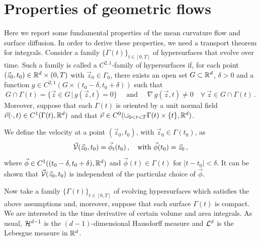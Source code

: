 \section{Properties of geometric flows}\label{sec:geometric_flows_properties}
Here we report some fundamental properties of the mean curvature flow and
surface diffusion. In order to derive these properties, we need a transport
theorem for integrals. Consider a family $\{ \Gamma(t) \}_{t \in [0, T]}$
of hypersurfaces that evolve over time. Such a family is called a
$C^{2,1}$-family of hypersurfaces if, for each point $(\vec z_0, t_0) \in
{\mathbb R}^{d} \times (0, T)$ with $\vec z_0 \in \Gamma_0$, there exists an
open set $G \subset {\mathbb R}^{d}$, $\delta > 0$ and a function
$g \in C^{2,1}(G \times (t_0 - \delta, t_0 + \delta))$ such that
\begin{equation}
G \cap \Gamma (t) = \{ \vec{z} \in G \, | \, g (\vec z, t) = 0 \}
\quad \mbox{ and } \quad \nabla \, g (\vec z, t) \neq 0
\quad \forall\ \vec z \in G \cap \Gamma(t) \, .
\end{equation}
\sloppy Moreover, suppose that each $\Gamma(t)$ is oriented by a unit normal
field ${\vec \nu(\cdot,t)\in C^1(\Gamma(t),{\mathbb R}^d)}$ and that $\vec \nu\in
C^0(\cup_{0<t<T}\Gamma(t)\times\{t\},{\mathbb R}^d)$.

We define the velocity at a point $(\vec z_0,t_0)$, with $\vec z_0\in
\Gamma(t_0)$, as
\begin{equation}
\vec{\mathcal{V}}(\vec z_0,t_0)= \vec \phi_t(t_0)\,, \quad
\mbox{with }\vec \phi(t_0)=\vec z_0\,,
\end{equation}
where $\vec \phi\in C^1((t_0 - \delta, t_0 + \delta),{\mathbb R}^d)$ and
$\vec \phi(t)\in\Gamma(t)$ for $|t-t_0|<\delta$. It can be shown that $\vec{\mathcal{V}}(\vec
z_0,t_0)$ is independent of the particular choice of $\vec \phi$.

Now take a family $\{ \Gamma(t) \}_{t \in [0, T]}$ of evolving hypersurfaces
which satisfies the above assumptions and, moreover, suppose that each surface
$\Gamma(t)$ is compact. We are interested in the time derivative of certain
volume and area integrals. As usual, $\mathcal{H}^{d-1}$ is the $(d-1)$-dimensional
Hausdorff measure and $\mathcal{L}^d$ is the Lebesgue measure in ${\mathbb R}^d$.

